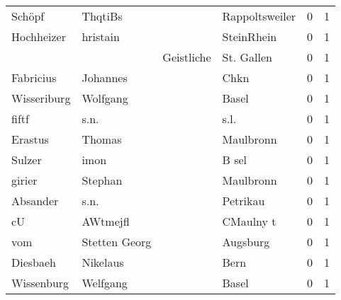 \begin{center}
\begin{tiny}
\begin{longtabu}{llllrr}
                   Schöpf &                            ThqtiBs &             &                              Rappoltsweiler &          0 &         1 \\
               Hochheizer &                           hristain &             &                                  SteinRhein &          0 &         1 \\
                          &                                    &  Geistliche &                                  St. Gallen &          0 &         1 \\
                Fabricius &                           Johannes &             &                                        Chkn &          0 &         1 \\
              Wisseriburg &                           Wolfgang &             &                                       Basel &          0 &         1 \\
                    fiftf &                               s.n. &             &                                        s.l. &          0 &         1 \\
                  Erastus &                             Thomas &             &                                   Maulbronn &          0 &         1 \\
                   Sulzer &                               imon &             &                                       B sel &          0 &         1 \\
                   girier &                            Stephan &             &                                   Maulbronn &          0 &         1 \\
                 Absander &                               s.n. &             &                                    Petrikau &          0 &         1 \\
                       cU &                           AWtmejfl &             &                                   CMaulny t &          0 &         1 \\
                      vom &                      Stetten Georg &             &                                    Augsburg &          0 &         1 \\
                 Diesbaeh &                           Nikelaus &             &                                        Bern &          0 &         1 \\
               Wissenburg &                           Welfgang &             &                                       Basel &          0 &         1 \\

\end{longtabu}
\end{tiny}
\end{center}
